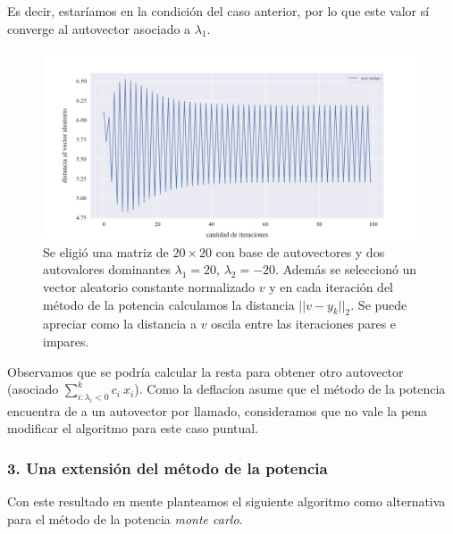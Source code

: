 \vspace{1em}
Es decir, estaríamos en la condición del caso anterior, por lo que este valor sí converge al autovector asociado a $\lambda_1$.

\begin{figure}[!htbp]
    \includegraphics[scale=0.45]{files/src/.media/op_oscilante.png}
    \caption{Se eligió una matriz de $20 \times 20$ con base de autovectores y dos autovalores dominantes $\lambda_1 = 20$, $\lambda_2 = -20$. Además se seleccionó un vector aleatorio constante normalizado $v$ y en cada iteración del método de la potencia calculamos la distancia $||v - y_k||_2$. Se puede apreciar como la distancia a $v$ oscila entre las iteraciones pares e impares.}
    \label{fig:oscilante}
\end{figure}

\vspace{1em}

\vspace{1em}
Observamos que se podría calcular la resta para obtener otro autovector (asociado $\sum_{i: \lambda_i < 0}^{k} c_i\ x_i$). Como la deflacíon asume que el método de la potencia encuentra de a un autovector por llamado, consideramos que no vale la pena modificar el algoritmo para este caso puntual.


\vspace{2em}
\subsubsection*{3. Una extensión del método de la potencia} Con este resultado en mente planteamos el siguiente algoritmo como alternativa para el método de la potencia \textit{monte carlo}.

\vspace{1em}


